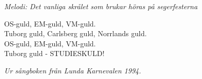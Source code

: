 {\footnotesize\textit{Melodi: Det vanliga skrålet som brukar höras på segerfesterna}}\par
\vspace{10pt}
OS-guld, EM-guld, VM-guld.\\
Tuborg guld, Carlsberg guld, Norrlands guld.\\
OS-guld, EM-guld, VM-guld.\\
Tuborg guld - STUDIESKULD!\par
\vspace{10pt}
{\footnotesize\textit{Ur sångboken från Lunda Karnevalen 1994.}}
